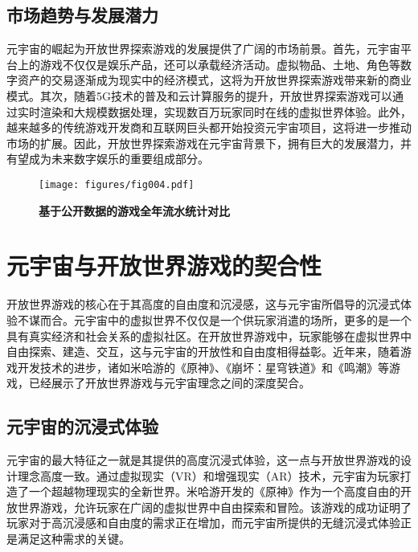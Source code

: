 \documentclass[UTF8]{ctexart}
\begin{document}
	\subsection{市场趋势与发展潜力}
	元宇宙的崛起为开放世界探索游戏的发展提供了广阔的市场前景。首先，元宇宙平台上的游戏不仅仅是娱乐产品，还可以承载经济活动。虚拟物品、土地、角色等数字资产的交易逐渐成为现实中的经济模式，这将为开放世界探索游戏带来新的商业模式。其次，随着5G技术的普及和云计算服务的提升，开放世界探索游戏可以通过实时渲染和大规模数据处理，实现数百万玩家同时在线的虚拟世界体验。此外，越来越多的传统游戏开发商和互联网巨头都开始投资元宇宙项目，这将进一步推动市场的扩展\cite{park2021metaverse}。因此，开放世界探索游戏在元宇宙背景下，拥有巨大的发展潜力，并有望成为未来数字娱乐的重要组成部分。
	\begin{figure}[htbp] %
		\centering %
		\texttt{[image: figures/fig004.pdf]} %
		\caption{\textbf{基于公开数据的游戏全年流水统计对比}} %
		\label{fig:4} %
	\end{figure}
	
	
	\section{元宇宙与开放世界游戏的契合性}
	
	开放世界游戏的核心在于其高度的自由度和沉浸感，这与元宇宙所倡导的沉浸式体验不谋而合。元宇宙中的虚拟世界不仅仅是一个供玩家消遣的场所，更多的是一个具有真实经济和社会关系的虚拟社区\cite{park2021metaverse}。在开放世界游戏中，玩家能够在虚拟世界中自由探索、建造、交互，这与元宇宙的开放性和自由度相得益彰。近年来，随着游戏开发技术的进步，诸如米哈游的《原神》、《崩坏：星穹铁道》和《鸣潮》等游戏，已经展示了开放世界游戏与元宇宙理念之间的深度契合\cite{mihoyo2021genshin}\cite{mihoyo2022starrail}。
	
	\subsection{元宇宙的沉浸式体验}
	元宇宙的最大特征之一就是其提供的高度沉浸式体验，这一点与开放世界游戏的设计理念高度一致。通过虚拟现实（VR）和增强现实（AR）技术，元宇宙为玩家打造了一个超越物理现实的全新世界\cite{grigore2021vrgames}。米哈游开发的《原神》作为一个高度自由的开放世界游戏，允许玩家在广阔的虚拟世界中自由探索和冒险。该游戏的成功证明了玩家对于高沉浸感和自由度的需求正在增加，而元宇宙所提供的无缝沉浸式体验正是满足这种需求的关键\cite{boellstorff2021coming}。
	
\end{document}
